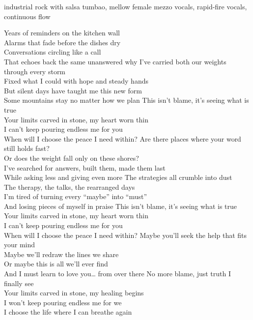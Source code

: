 
\begin{notes}
\end{notes}
\begin{style}
industrial rock with salsa tumbao, mellow female mezzo vocals, rapid-fire vocals, continuous flow
\end{style}
\begin{lyrics}
Years of reminders on the kitchen wall\\
Alarms that fade before the dishes dry\\
Conversations circling like a call\\
That echoes back the same unanswered why
I’ve carried both our weights through every storm\\
Fixed what I could with hope and steady hands\\
But silent days have taught me this new form\\
Some mountains stay no matter how we plan
This isn’t blame, it’s seeing what is true\\
Your limits carved in stone, my heart worn thin\\
I can’t keep pouring endless me for you\\
When will I choose the peace I need within?
Are there places where your word still holds fast?\\
Or does the weight fall only on these shores?\\
I’ve searched for answers, built them, made them last\\
While asking less and giving even more
The strategies all crumble into dust\\
The therapy, the talks, the rearranged days\\
I’m tired of turning every “maybe” into “must”\\
And losing pieces of myself in praise
This isn’t blame, it’s seeing what is true\\
Your limits carved in stone, my heart worn thin\\
I can’t keep pouring endless me for you\\
When will I choose the peace I need within?
Maybe you’ll seek the help that fits your mind\\
Maybe we’ll redraw the lines we share\\
Or maybe this is all we’ll ever find\\
And I must learn to love you… from over there
No more blame, just truth I finally see\\
Your limits carved in stone, my healing begins\\
I won’t keep pouring endless me for we\\
I choose the life where I can breathe again
\end{lyrics}

